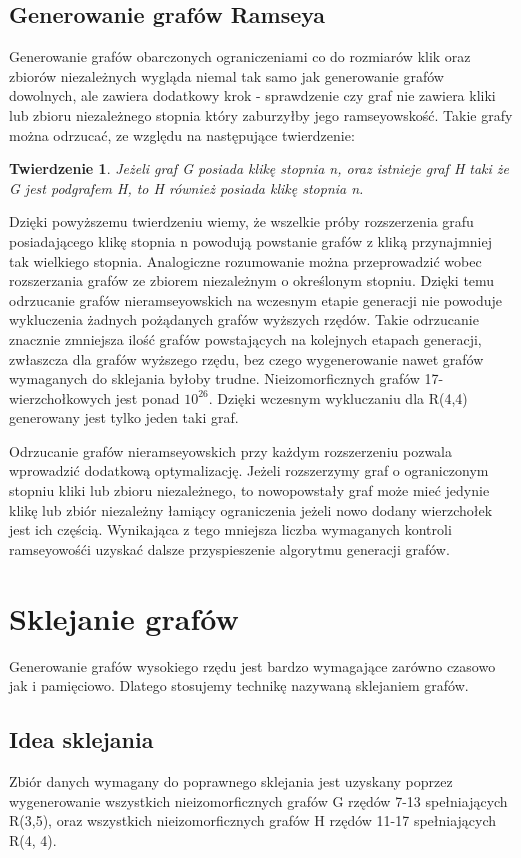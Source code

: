 \documentclass[11pt]{article}
\newtheorem{theorem}{Twierdzenie}
\begin{document}
   \subsection{Generowanie grafów Ramseya}
   Generowanie grafów obarczonych ograniczeniami co do rozmiarów klik oraz zbiorów niezależnych wygląda niemal tak samo jak generowanie grafów dowolnych, 
   ale zawiera dodatkowy krok - sprawdzenie czy graf nie zawiera kliki lub zbioru niezależnego stopnia który zaburzyłby jego ramseyowskość. Takie grafy można odrzucać, ze względu na następujące twierdzenie:
     \begin{theorem}
      Jeżeli graf G posiada klikę stopnia n, oraz istnieje graf H taki że G jest podgrafem H, to H również posiada klikę stopnia n.
   \end{theorem}
  Dzięki powyższemu twierdzeniu wiemy, że wszelkie próby rozszerzenia grafu posiadającego klikę stopnia n powodują powstanie grafów z kliką przynajmniej tak wielkiego stopnia. Analogiczne rozumowanie można przeprowadzić wobec rozszerzania grafów ze zbiorem niezależnym o określonym stopniu. Dzięki temu odrzucanie grafów nieramseyowskich na wczesnym etapie generacji nie powoduje wykluczenia żadnych pożądanych grafów wyższych rzędów. Takie odrzucanie znacznie zmniejsza ilość grafów powstających na kolejnych etapach generacji, zwłaszcza dla grafów wyższego rzędu, bez czego wygenerowanie nawet grafów wymaganych do sklejania byłoby trudne. Nieizomorficznych grafów 17-wierzchołkowych jest ponad $10^{26}$\cite{OEIS}. Dzięki wczesnym wykluczaniu dla R(4,4) generowany jest tylko jeden taki graf. 
  
Odrzucanie grafów nieramseyowskich przy każdym rozszerzeniu pozwala wprowadzić dodatkową optymalizację. Jeżeli rozszerzymy graf o ograniczonym stopniu kliki lub zbioru niezależnego, to nowopowstały graf może mieć jedynie klikę lub zbiór niezależny łamiący ograniczenia jeżeli nowo dodany wierzchołek jest ich częścią. Wynikająca z tego mniejsza liczba wymaganych kontroli ramseyowośći uzyskać dalsze przyspieszenie algorytmu generacji grafów.


\section{Sklejanie grafów}
Generowanie grafów wysokiego rzędu jest bardzo wymagające zarówno czasowo jak i pamięciowo. Dlatego stosujemy technikę nazywaną sklejaniem grafów. 

\subsection{Idea sklejania}
Zbiór danych wymagany do poprawnego sklejania jest uzyskany poprzez wygenerowanie wszystkich nieizomorficznych grafów G rzędów 7-13 spełniających R(3,5), oraz wszystkich nieizomorficznych grafów H rzędów 11-17 spełniających R(4, 4).
\end{document}
